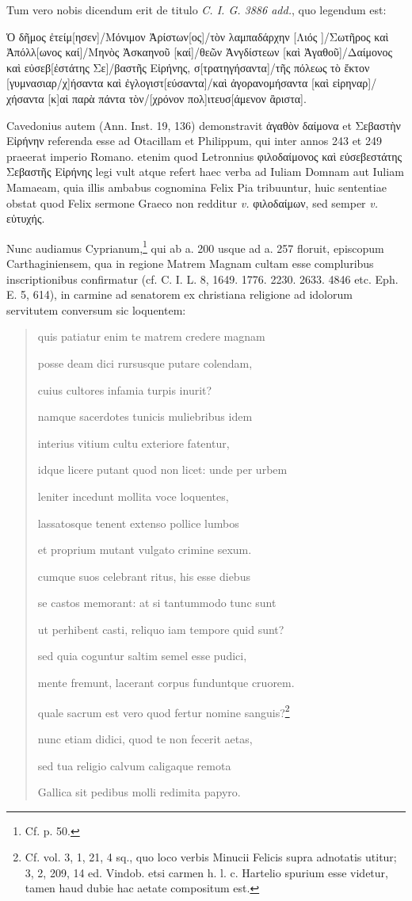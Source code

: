 \documentclass[a4paper, 11pt, oneside, polutonikogreek, german, twocolumn]{article}
\begin{document}
Tum vero nobis dicendum erit de titulo \emph{C. I. G. 3886 add.}, quo legendum est:

Ὁ δῆμος ἐτείμ[ησεν]/Μόνιμον Ἀρίστων[ος]/τὸν λαμπαδάρχην [Λιός ]/Σωτῆρος καὶ Ἀπόλλ[ωνος καί]/Μηνὸς Ἀσκαηνοῦ [καί]/θεῶν Ἀνγδίστεων [καὶ Ἀγαθοῦ]/Δαίμονος καὶ εὐσεβ[ἐστάτης Σε]/βαστῆς Εἰρήνης, σ[τρατηγήσαντα]/τῆς πόλεως τὸ ἔκτον [γυμνασιαρ/χ]ήσαντα καὶ ἐγλογιστ[εύσαντα]/καὶ ἀγορανομήσαντα [καὶ εἰρηναρ]/χήσαντα [κ]αἱ παρὰ πάντα τὸν/[χρόνον πολ]ιτευσ[άμενον ἂριστα].

Cavedonius autem (Ann. Inst. 19, 136) demonstravit ἀγαθὸν δαίμονα et Σεβαστὴν Εἰρήνην referenda esse ad Otacillam et Philippum, qui inter annos 243 et 249 praeerat imperio Romano. etenim quod Letronnius φιλοδαίμονος καὶ εὐσεβεστάτης Σεβαστῆς Εἰρήνης legi vult atque refert haec verba ad Iuliam Domnam aut Iuliam Mamaeam, quia illis ambabus cognomina Felix Pia tribuuntur, huic sententiae obstat quod Felix sermone Graeco non redditur \emph{v.} φιλοδαίμων, sed semper \emph{v.} εὐτυχής.

Nunc audiamus Cyprianum,\footnote{Cf. p. 50.} qui ab a. 200 usque ad a. 257 floruit, episcopum Carthaginiensem, qua in regione Matrem Magnam cultam esse compluribus inscriptionibus confirmatur (cf. C. I. L. 8, 1649. 1776. 2230. 2633. 4846 etc. Eph. E. 5, 614), in carmine ad senatorem ex christiana religione ad idolorum servitutem conversum sic loquentem:
\begin{quotation}
quis patiatur enim te matrem credere magnam

posse deam dici rursusque putare colendam,

cuius cultores infamia turpis inurit?

namque sacerdotes tunicis muliebribus idem

interius vitium cultu exteriore fatentur,

idque licere putant quod non licet: unde per urbem

leniter incedunt mollita voce loquentes,

lassatosque tenent extenso pollice lumbos

et proprium mutant vulgato crimine sexum.

cumque suos celebrant ritus, his esse diebus

se castos memorant: at si tantummodo tunc sunt

ut perhibent casti, reliquo iam tempore quid sunt?

sed quia coguntur saltim semel esse pudici,

mente fremunt, lacerant corpus funduntque cruorem.

quale sacrum est vero quod fertur nomine sanguis?\footnote{Cf. vol. 3, 1, 21, 4 sq., quo loco verbis Minucii Felicis supra adnotatis utitur; 3, 2, 209, 14 ed. Vindob. etsi carmen h. l. c. Hartelio spurium esse videtur, tamen haud dubie hac aetate compositum est.}

nunc etiam didici, quod te non fecerit aetas,

sed tua religio calvum caligaque remota

Gallica sit pedibus molli redimita papyro.
\end{quotation}
\end{document}
